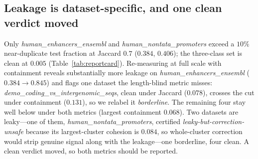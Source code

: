\documentclass[webpdf,modern,large,namedate]{oup-authoring-template}%
\begin{document}
\subsection{Leakage is dataset-specific, and one clean verdict moved}\label{sec:r-card}
Only \textit{human\_enhancers\_ensembl} and \textit{human\_nontata\_promoters} exceed a $10\%$ near-duplicate test fraction at Jaccard $0.7$ ($0.384$, $0.406$); the three-class set is clean at $0.005$ (Table~\ref{tab:reportcard}). Re-measuring at full scale with containment reveals substantially more leakage on \textit{human\_enhancers\_ensembl} ($0.384\to0.845$) and flags one dataset the length-blind metric misses: \textit{demo\_coding\_vs\_intergenomic\_seqs}, clean under Jaccard ($0.078$), crosses the cut under containment ($0.131$), so we relabel it \emph{borderline}. The remaining four stay well below under both metrics (largest containment $0.068$). Two datasets are leaky---one of them, \textit{human\_nontata\_promoters}, certified \emph{leaky-but-correction-unsafe} because its largest-cluster cohesion is $0.084$, so whole-cluster correction would strip genuine signal along with the leakage---one borderline, four clean. A clean verdict moved, so both metrics should be reported.
\end{document}
